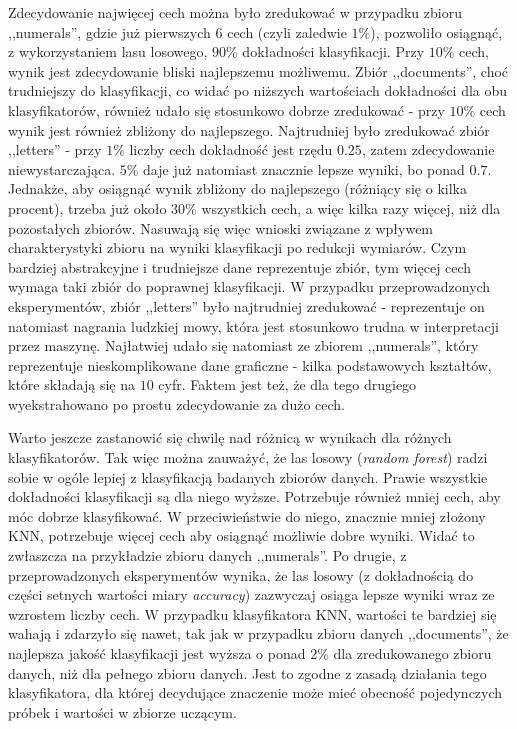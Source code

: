\documentclass{classrep}
\begin{document}
{{            Zdecydowanie najwięcej cech można było zredukować w przypadku zbioru ,,numerals'', gdzie już pierwszych $6$ cech (czyli zaledwie $1\%$), pozwoliło osiągnąć, z wykorzystaniem lasu losowego, $90\%$ dokładności klasyfikacji. Przy $10\%$ cech, wynik jest zdecydowanie bliski najlepszemu możliwemu. Zbiór ,,documents'', choć trudniejszy do klasyfikacji, co widać po niższych wartościach dokładności dla obu klasyfikatorów, również udało się stosunkowo dobrze zredukować - przy $10\%$ cech wynik jest również zbliżony do najlepszego. Najtrudniej było zredukować zbiór ,,letters'' - przy $1\%$ liczby cech dokładność jest rzędu $0.25$, zatem zdecydowanie niewystarczająca. $5\%$ daje już natomiast znacznie lepsze wyniki, bo ponad $0.7$. Jednakże, aby osiągnąć wynik zbliżony do najlepszego (różniący się o kilka procent), trzeba już około $30\%$ wszystkich cech, a więc kilka razy więcej, niż dla pozostałych zbiorów. Nasuwają się więc wnioski związane z wpływem charakterystyki zbioru na wyniki klasyfikacji po redukcji wymiarów. Czym bardziej abstrakcyjne i trudniejsze dane reprezentuje zbiór, tym więcej cech wymaga taki zbiór do poprawnej klasyfikacji. W przypadku przeprowadzonych eksperymentów, zbiór ,,letters'' było najtrudniej zredukować - reprezentuje on natomiast nagrania ludzkiej mowy, która jest stosunkowo trudna w interpretacji przez maszynę. Najłatwiej udało się natomiast ze zbiorem ,,numerals'', który reprezentuje nieskomplikowane dane graficzne - kilka podstawowych kształtów, które składają się na $10$ cyfr. Faktem jest też, że dla tego drugiego wyekstrahowano po prostu zdecydowanie za dużo cech.
            
            Warto jeszcze zastanowić się chwilę nad różnicą w wynikach dla różnych klasyfikatorów. Tak więc można zauważyć, że las losowy (\emph{random forest}) radzi sobie w ogóle lepiej z klasyfikacją badanych zbiorów danych. Prawie wszystkie dokładności klasyfikacji są dla niego wyższe. Potrzebuje również mniej cech, aby móc dobrze klasyfikować. W przeciwieństwie do niego, znacznie mniej złożony KNN, potrzebuje więcej cech aby osiągnąć możliwie dobre wyniki. Widać to zwłaszcza na przykładzie zbioru danych ,,numerals''. Po drugie, z przeprowadzonych eksperymentów wynika, że las losowy (z dokładnością do części setnych wartości miary \emph{accuracy}) zazwyczaj osiąga lepsze wyniki wraz ze wzrostem liczby cech. W przypadku klasyfikatora KNN, wartości te bardziej się wahają i zdarzyło się nawet, tak jak w przypadku zbioru danych ,,documents'', że najlepsza jakość klasyfikacji jest wyższa o ponad $2\%$ dla zredukowanego zbioru danych, niż dla pełnego zbioru danych. Jest to zgodne z zasadą działania tego klasyfikatora, dla której decydujące znaczenie może mieć obecność pojedynczych próbek i wartości w zbiorze uczącym.
        }

}
\end{document}
